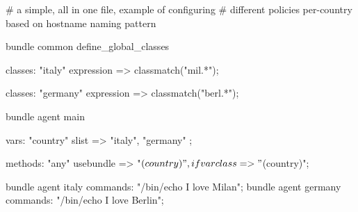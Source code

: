 \begin{codelisting}
\begin{code}
# a simple, all in one file, example of configuring
# different policies per-country based on hostname naming pattern


bundle common define_global_classes {

      classes: "italy"   expression => classmatch("mil.*");

      classes: "germany" expression => classmatch("berl.*");

}




bundle agent main {

  vars:
      "country"
        slist => { "italy", "germany" };

  methods:
      "any"
        usebundle => "$(country)",
        ifvarclass => "$(country)";
}


bundle agent italy   { commands: "/bin/echo I love Milan";  }
bundle agent germany { commands: "/bin/echo I love Berlin"; }
\end{code}
\end{codelisting}
